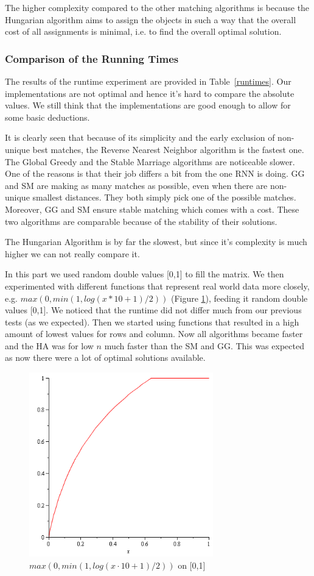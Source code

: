 \documentclass[a4paper,11pt]{article}
\begin{document}
The higher complexity compared to the other matching algorithms is because the Hungarian algorithm aims to assign the objects in such a way that the overall cost of all assignments is minimal, i.e. to find the overall optimal solution.

\subsubsection{Comparison of the Running Times}
The results of the runtime experiment are provided in Table~\ref{runtimes}. Our implementations are not optimal and hence it's hard to compare the absolute values. We still think that the implementations are good enough to allow for some basic deductions.


It is clearly seen that because of its simplicity and the early exclusion of non-unique best matches, the Reverse Nearest Neighbor algorithm is the fastest one. The Global Greedy and the Stable Marriage algorithms are noticeable slower. One of the reasons is that their job differs a bit from the one RNN is doing. GG and SM are making as many matches as possible, even when there are non-unique smallest distances. They both simply pick one of the possible matches. Moreover, GG and SM ensure stable matching which comes with a cost. These two algorithms are comparable because of the stability of their solutions.

The Hungarian Algorithm is by far the slowest, but since it's complexity is much higher we can not really compare it.

In this part we used random double values [0,1] to fill the matrix. We then experimented with different functions that represent real world data more closely, e.g. $max(0,min(1,log(x*10 + 1)/2))$ (Figure \ref{logfill}), feeding it random double values [0,1]. We noticed that the runtime did not differ much from our previous tests (as we expected). Then we started using functions that resulted in a high amount of lowest values for rows and column. Now all algorithms became faster and the HA was for low $n$ much faster than the SM and GG. This was expected as now there were a lot of optimal solutions available.

\begin{figure}[ht!]
\centering 
\includegraphics[width=80mm]{logfunction.png}
\caption{$max(0,min(1,log(x \cdot 10 + 1)/2))$ on [0,1]}
\label{logfill} 
\end{figure}
\end{document}
